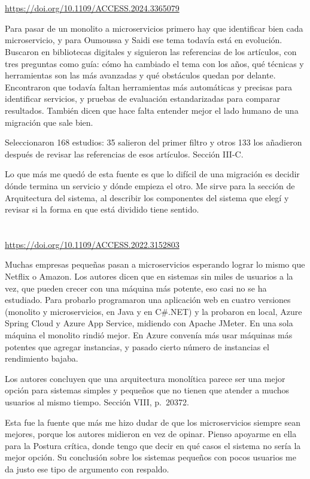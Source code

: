 \documentclass[11pt,a4paper]{article}
\newcommand{\ficha}[6]{%
  \section{\texorpdfstring{\citefield{#2}{title}}{#1}}
  \begin{description}[style=nextline,leftmargin=0pt,itemsep=6pt]
    \item[Referencia (IEEE)] \cite{#2}
    \item[DOI verificado] \href{https://doi.org/#3}{https://doi.org/#3}
    \item[Resumen] #4
    \item[Dato concreto] #5
    \item[Nota personal] #6
  \end{description}
}
\begin{document}
\ficha{Oumoussa y Saidi (2024)}{oumoussa2024}{10.1109/ACCESS.2024.3365079}
{Para pasar de un monolito a microservicios primero hay que identificar bien cada microservicio, y para Oumoussa y Saidi ese tema todavía está en evolución. Buscaron en bibliotecas digitales y siguieron las referencias de los artículos, con tres preguntas como guía: cómo ha cambiado el tema con los años, qué técnicas y herramientas son las más avanzadas y qué obstáculos quedan por delante. Encontraron que todavía faltan herramientas más automáticas y precisas para identificar servicios, y pruebas de evaluación estandarizadas para comparar resultados. También dicen que hace falta entender mejor el lado humano de una migración que sale bien.}
{Seleccionaron 168 estudios: 35 salieron del primer filtro y otros 133 los añadieron después de revisar las referencias de esos artículos. Sección III-C.}
{Lo que más me quedó de esta fuente es que lo difícil de una migración es decidir dónde termina un servicio y dónde empieza el otro. Me sirve para la sección de Arquitectura del sistema, al describir los componentes del sistema que elegí y revisar si la forma en que está dividido tiene sentido.}

\ficha{Blinowski, Ojdowska y Przybyłek (2022)}{blinowski2022}{10.1109/ACCESS.2022.3152803}
{Muchas empresas pequeñas pasan a microservicios esperando lograr lo mismo que Netflix o Amazon. Los autores dicen que en sistemas sin miles de usuarios a la vez, que pueden crecer con una máquina más potente, eso casi no se ha estudiado. Para probarlo programaron una aplicación web en cuatro versiones (monolito y microservicios, en Java y en C\#.NET) y la probaron en local, Azure Spring Cloud y Azure App Service, midiendo con Apache JMeter. En una sola máquina el monolito rindió mejor. En Azure convenía más usar máquinas más potentes que agregar instancias, y pasado cierto número de instancias el rendimiento bajaba.}
{Los autores concluyen que una arquitectura monolítica parece ser una mejor opción para sistemas simples y pequeños que no tienen que atender a muchos usuarios al mismo tiempo. Sección VIII, p.~20372.}
{Esta fue la fuente que más me hizo dudar de que los microservicios siempre sean mejores, porque los autores midieron en vez de opinar. Pienso apoyarme en ella para la Postura crítica, donde tengo que decir en qué casos el sistema no sería la mejor opción. Su conclusión sobre los sistemas pequeños con pocos usuarios me da justo ese tipo de argumento con respaldo.}
\end{document}
